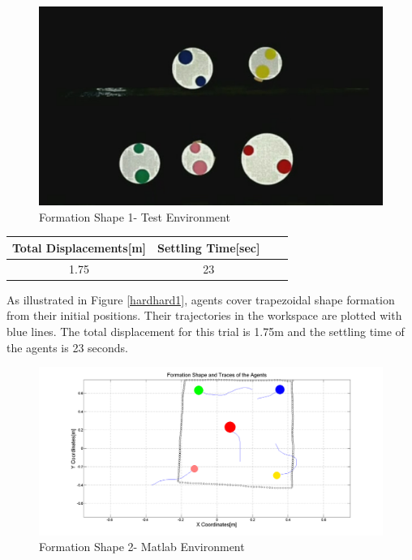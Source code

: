 \begin{figure}[H]
\caption{Formation Shape 1- Test Environment}
\centerline{\includegraphics[scale = 0.35]{2_real_hardware}}
\end{figure} 
					
\begin{center}
 \label{hardwareshape1_ref} 
\begin{tabular}{||c| c |c |c ||}
\hline
\textbf{Total Displacements[m]}  & \textbf{Settling Time[sec]}\\ 
\hline
1.75 & 23 \\
\hline
\end{tabular}
\end{center}

As illustrated in Figure \ref{hardhard1}, agents cover trapezoidal shape formation from their initial positions. Their trajectories in the workspace are plotted with blue lines. The total displacement for this trial is 1.75m and the settling time of the agents is 23 seconds.		
\begin{figure}[H]
\caption{Formation Shape 2- Matlab Environment} \label{hardhard2}
\centerline{\includegraphics[scale = 0.32]{4_hardware}}
\end{figure} 
					
